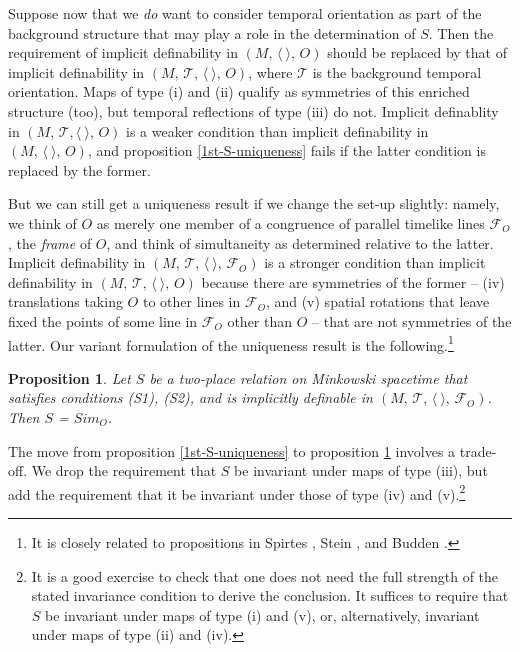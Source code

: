 \documentclass [12] {article}
\theoremstyle{plain}
\newtheorem{proposition}{Proposition}[subsection]
\numberwithin{figure}{subsection}
\numberwithin{proposition}{subsection}
\begin{document}
Suppose now that we \emph{do} want to consider  temporal orientation as part of the background structure that may play a role in the determination of $S$. Then  the requirement of implicit definability in $(M, \,   \langle \  \rangle, \,  O)$  should be replaced by that of implicit definability in $(M, \,  \mathcal{T}, \,  \langle \  \rangle, \,  O)$,  where $\mathcal{T}$ is the background temporal orientation.  Maps of type (i) and (ii) qualify as symmetries of this enriched structure (too), but temporal reflections of type (iii) do not. Implicit definablity in $(M, \, \mathcal{T},    \langle \  \rangle, \,  O)$ is a weaker condition than  implicit definability in $(M, \,   \langle \  \rangle, \,  O)$, and  proposition \ref{1st-S-uniqueness}  fails if the latter condition is replaced by the former. 

But we can still get a uniqueness result if we change the set-up  slightly:  namely, we think of $O$ as merely one member of a congruence of parallel timelike lines $\mathcal{F}_O$, the \emph{frame} of $O$, and think of simultaneity as determined relative to the latter. Implicit definability in $(M, \, \mathcal{T},  \,   \langle \  \rangle, \,  \mathcal{F}_O)$ is a stronger condition than implicit definability in $(M, \, \mathcal{T}, \,   \langle \  \rangle, \,  O)$ because there are symmetries of the former  -- (iv) translations taking $O$ to other lines in $\mathcal{F}_O$, and  (v) spatial rotations that leave fixed the points of some line in $ \mathcal{F}_O$ other than $O$  --  that are not symmetries of the latter.  Our variant formulation of the uniqueness result is the following.\footnote{It is closely related to propositions in Spirtes , Stein , and Budden .}
\begin{proposition} \label{2nd-S-uniqueness} 
Let $S$ be a two-place relation on Minkowski spacetime that satisfies conditions (S1), (S2), and is implicitly definable in $(M, \, \mathcal{T},  \,   \langle \  \rangle, \,  \mathcal{F}_O)$. Then $S$ = $Sim_O$.
\end{proposition}
% 

The move from proposition \ref{1st-S-uniqueness} to proposition  \ref{2nd-S-uniqueness} involves a trade-off.  We drop the requirement that $S$ be invariant under maps of type (iii), but add the requirement that it be invariant under those of type (iv) and (v).\footnote{It is a good exercise to check that one does not need the full strength of the stated invariance condition to derive the conclusion. It suffices to require that $S$ be invariant under maps of type (i) and (v), or, alternatively, invariant under maps of type (ii) and (iv).}
\end{document}
